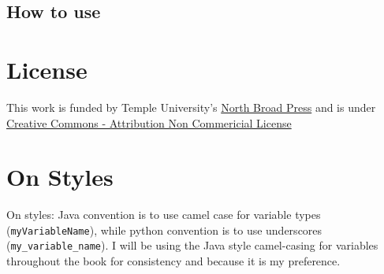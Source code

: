 \subsection{How to use}

\section{License}
This work is funded by Temple University's \href{http://tupress.temple.edu/open-access/north-broad-press}{North Broad Press} and is under \href{https://creativecommons.org/licenses/by-nc/3.0/}{Creative Commons - Attribution Non Commericial License}

\section{On Styles}
On styles:  Java convention is to use camel case for variable types (\texttt{myVariableName}), while python convention is to use underscores (\texttt{my\_variable\_name}).  I will be using the Java style camel-casing for variables throughout the book for consistency and because it is my preference.

